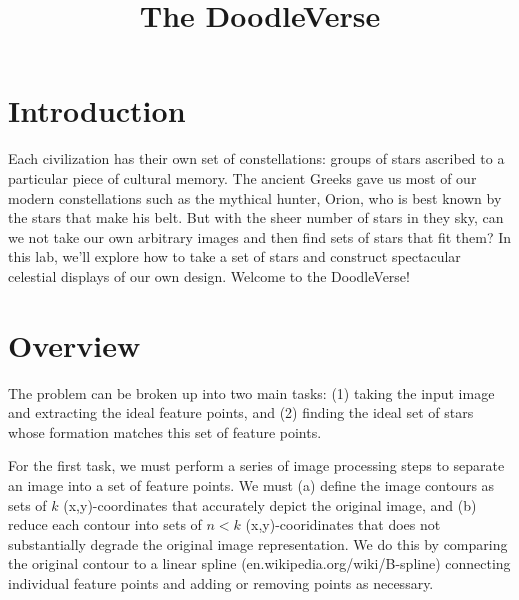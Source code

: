 \documentclass[paper=a4, fontsize=11pt]{scrartcl} %
\title{
\normalfont \normalsize
\huge The DoodleVerse \\ %
}
\date{}
\begin{document}
\maketitle

\begin{figure}[!h]
\captionsetup{labelformat=empty}
\caption{}
\end{figure}

\section{Introduction}

Each civilization has their own set of constellations: groups of stars ascribed to a particular piece of cultural
memory. The ancient Greeks gave us most of our modern constellations such as the mythical hunter, Orion, who is best known by the stars that make his belt. But with the sheer number of stars in they sky, can we not take our own arbitrary images and then find sets of stars that fit them? In this lab, we’ll explore how to take a set of stars and construct spectacular celestial displays of our own design. Welcome to the DoodleVerse!

\section{Overview}

The problem can be broken up into two main tasks: (1) taking the input image and extracting the ideal feature points, and (2) finding the ideal set of stars whose formation matches this set of feature points.

For the first task, we must perform a series of image processing steps to separate an image into a set of feature points. We must (a) define the image contours as sets of $k$ (x,y)-coordinates that accurately depict the original image, and (b) reduce each contour into sets of $n<k$ (x,y)-cooridinates that does not substantially degrade the original image representation. We do this by comparing the original contour to a linear spline (en.wikipedia.org/wiki/B-spline) connecting individual feature points and adding or removing points as necessary. 
\end{document}
